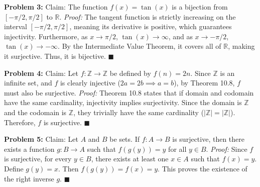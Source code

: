 \documentclass[11pt, a4paper]{article}
\theoremstyle{definition}
\theoremstyle{remark}
\newcommand{\R}{\mathbb{R}}
\newcommand{\Z}{\mathbb{Z}}
\begin{document}
\textbf{Problem 3:} Claim: The function $f(x) = \tan(x)$ is a bijection from $[-\pi/2, \pi/2]$ to $\R$.
\textit{Proof:} The tangent function is strictly increasing on the interval $[-\pi/2, \pi/2]$, meaning its derivative is positive, which guarantees injectivity. Furthermore, as $x \to \pi/2$, $\tan(x) \to \infty$, and as $x \to -\pi/2$, $\tan(x) \to -\infty$. By the Intermediate Value Theorem, it covers all of $\R$, making it surjective. Thus, it is bijective. $\blacksquare$

\textbf{Problem 4:} Claim: Let $f: \Z \to \Z$ be defined by $f(n) = 2n$. Since $\Z$ is an infinite set, and $f$ is clearly injective ($2a=2b \implies a=b$), by Theorem 10.8, $f$ must also be surjective.
\textit{Proof:} Theorem 10.8 states that if domain and codomain have the same cardinality, injectivity implies surjectivity. Since the domain is $\Z$ and the codomain is $\Z$, they trivially have the same cardinality ($|\Z| = |\Z|$). Therefore, $f$ is surjective. $\blacksquare$

\textbf{Problem 5:} Claim: Let $A$ and $B$ be sets. If $f: A \to B$ is surjective, then there exists a function $g: B \to A$ such that $f(g(y)) = y$ for all $y \in B$.
\textit{Proof:} Since $f$ is surjective, for every $y \in B$, there exists at least one $x \in A$ such that $f(x) = y$. Define $g(y) = x$. Then $f(g(y)) = f(x) = y$. This proves the existence of the right inverse $g$. $\blacksquare$
\end{document}
